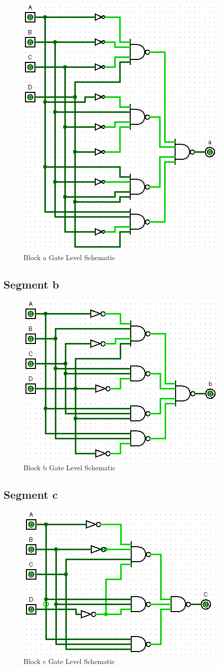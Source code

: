 \documentclass[12pt]{article}
\begin{document}
\begin{figure}[H]
	\centering
	\label{fig:aBlockGates}
	\includegraphics[width=0.5\linewidth, keepaspectratio]{a_logicCkt}
	\caption{Block a Gate Level Schematic}
\end{figure}

\subsection{Segment b}

\begin{figure}[H]
	\centering
	\label{fig:bBlockGates}
	\includegraphics[width=0.5\linewidth, keepaspectratio]{b_logicCkt}
	\caption{Block b Gate Level Schematic}
\end{figure}

\subsection{Segment c}
\begin{figure}[H]
	\centering
	\label{fig:cBlockGates}
	\includegraphics[width=0.5\linewidth, keepaspectratio]{c_logicCkt}
	\caption{Block c Gate Level Schematic}
\end{figure}
\end{document}
